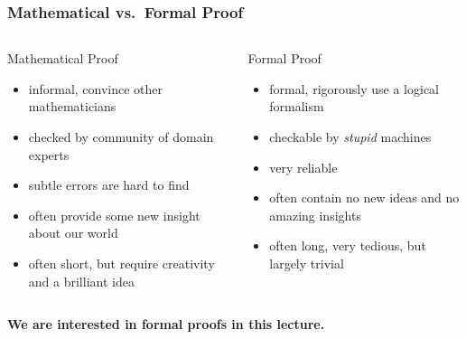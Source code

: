 \begin{frame}
\frametitle{Mathematical vs.\ Formal Proof}

\begin{columns}
\begin{column}{0.45\textwidth}

\begin{block}{Mathematical Proof}
\begin{itemize}
\item informal, convince other mathematicians
\item checked by community of domain experts
\item subtle errors are hard to find
\item often provide some new insight about our world
\item often short, but require creativity and a brilliant idea
\end{itemize}
\end{block}
\end{column}

\begin{column}{0.45\textwidth}
\begin{block}{Formal Proof}
\begin{itemize}
\item formal, rigorously use a logical formalism 
\item checkable by \textit{stupid} machines
\item very reliable
\item often contain no new ideas and no amazing insights
\item often long, very tedious, but largely trivial
\end{itemize}
\end{block}
\end{column}
\end{columns}

\begin{center}
\textbf{We are interested in formal proofs in this lecture.}
\end{center}

\end{frame}




